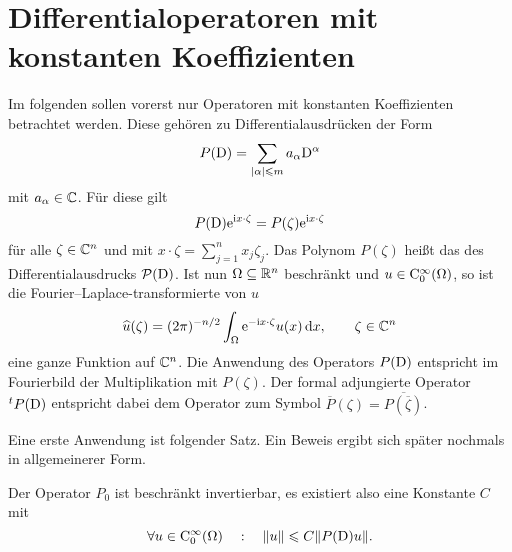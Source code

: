 \section{Differentialoperatoren mit konstanten Koeffizienten}
Im folgenden sollen vorerst nur Operatoren mit konstanten Koeffizienten betrachtet werden. Diese gehören zu Differentialausdrücken der Form
\begin{equation}
     P(\mathrm D) = \sum_{|\alpha|\leqslant m} a_\alpha \mathrm D^\alpha
\end{equation}
mit $a_\alpha\in\mathbb C$. Für diese gilt 
\begin{equation}
     P(\mathrm D) \mathrm e^{\mathrm i x\cdot\zeta}  =  P(\zeta) \mathrm e^{\mathrm i x\cdot\zeta}
\end{equation}
für alle $\zeta\in\mathbb C^n$ und mit $x\cdot\zeta = \sum_{j=1}^n x_j\zeta_j$. Das Polynom $ P(\zeta)$ heißt das  des Differentialausdrucks $\mathcal P(\mathrm D)$. Ist nun $\Omega\subseteq\mathbb R^n$ beschränkt und $u\in\mathrm C_0^\infty(\Omega)$, so ist die Fourier--Laplace-transformierte von $u$
\begin{equation}
    \widehat u (\zeta) = (2\pi)^{-n/2} \int_\Omega \mathrm e^{-\mathrm i x\cdot\zeta } u(x) \,\mathrm d x,\qquad \zeta\in\mathbb C^n
\end{equation}
eine ganze Funktion auf $\mathbb C^n$. Die Anwendung des Operators $ P(\mathrm D)$ entspricht im Fourierbild der Multiplikation mit $ P(\zeta)$. Der formal adjungierte Operator ${}^t P(\mathrm D)$ entspricht dabei dem Operator zum Symbol $\overline{P}(\zeta)=\overline{P(\overline\zeta)}$.

Eine erste Anwendung ist folgender Satz. Ein Beweis ergibt sich später nochmals in allgemeinerer Form.

\begin{thm}\label{thm:1:1.8}
Der Operator $P_0$ ist beschränkt invertierbar, es existiert also eine Konstante $C$ mit
\begin{equation}
   \forall u\in\mathrm C_0^\infty(\Omega)\quad:\quad \|u\|\leqslant C\| P(\mathrm D) u\|.
\end{equation}
\end{thm}

